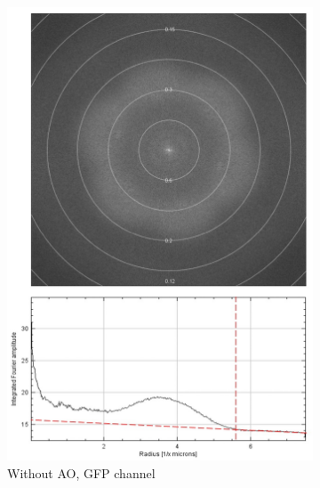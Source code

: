 \begin{figure}
	\vspace{-1cm}
	\begin{subfigure}[t]{0.45\textwidth}
		\centering
		\includegraphics[width=\linewidth]{images/DeepSIM_NMJ_woAO_GFP_ft_and_plot.jpg}
		\caption{Without AO, GFP channel}
		\label{fig:DeepSIM_NMJ_woAO_GFP_ft_and_plot}
	\end{subfigure}
	\begin{subfigure}[t]{0.45\textwidth}
		\centering

\end{subfigure}
\end{figure}
